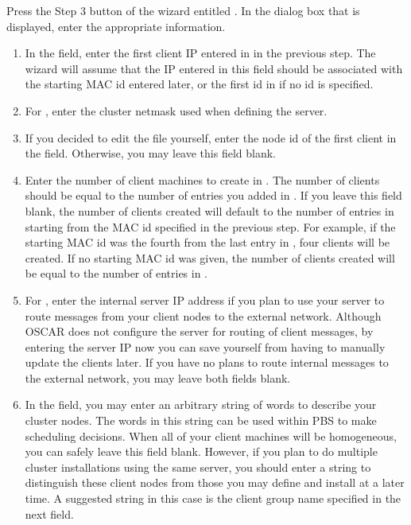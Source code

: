 Press the Step 3 button of the wizard entitled . In the dialog box that is displayed, enter the
appropriate information.

\begin{enumerate}
\item In the  field, enter the first client
  IP entered in  in the previous step. The wizard
  will assume that the IP entered in this field should be associated
  with the starting MAC id entered later, or the first id in
   if no id is specified.
    
\item For , enter the cluster netmask used when
  defining the server.
    
\item If you decided to edit the  file yourself,
  enter the node id of the first client in the 
  field. Otherwise, you may leave this field blank.
    
\item Enter the number of client machines to create in . The number of clients should be equal to
  the number of entries you added in . If you leave
  this field blank, the number of clients created will default to the
  number of entries in  starting from the MAC id
  specified in the previous step. For example, if the starting MAC id
  was the fourth from the last entry in , four
  clients will be created. If no starting MAC id was given, the number
  of clients created will be equal to the number of entries in
  .
    
\item For , enter the
  internal server IP address if you plan to use your server to route
  messages from your client nodes to the external network. Although
  OSCAR does not configure the server for routing of client messages,
  by entering the server IP now you can save yourself from having to
  manually update the clients later. If you have no plans to route
  internal messages to the external network, you may leave both fields
  blank.
    
\item In the  field, you may enter an arbitrary
  string of words to describe your cluster nodes. The words in this
  string can be used within PBS to make scheduling decisions. When all
  of your client machines will be homogeneous, you can safely leave
  this field blank. However, if you plan to do multiple cluster
  installations using the same server, you should enter a string to
  distinguish these client nodes from those you may define and install
  at a later time. A suggested string in this case is the client group
  name specified in the next field.
    

\end{enumerate}
